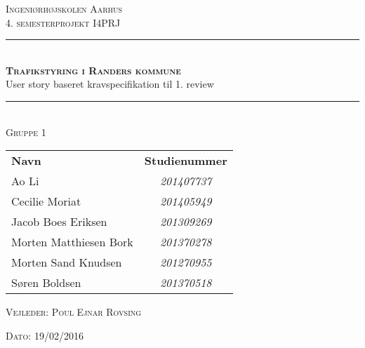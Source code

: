 \newcommand{\HRule}{\rule{\linewidth}{0.1mm}} %

\begin{center}
	\vspace{3cm}
	\textsc{\LARGE Ingeniørhøjskolen Aarhus}\\[1.5cm] %
	
	\textsc{\large 4. semesterprojekt I4PRJ}\\[2.5cm] 
	\HRule \\[0.8cm]
	{\huge \bfseries \textsc{Trafikstyring i Randers kommune}} \\[0.5cm]{\LARGE User story baseret kravspecifikation til 1. review} \\[0.4cm]
	\HRule \\[1.5cm]
	
	\textsc{\large Gruppe 1}\\
	\vspace{0.5 in}
	\begin{center}
		\begin{tabular}{l c}
			\textbf{Navn} & \textbf{Studienummer} \\
			Ao Li & \textsl{201407737}    \\
			Cecilie Moriat & \textsl{201405949}  \\
			Jacob Boes Eriksen & \textsl{201309269} \\
			Morten Matthiesen Bork & \textsl{201370278}  \\
			Morten Sand Knudsen & \textsl{201270955}  \\
			Søren Boldsen & \textsl{201370518}  \\
			
		\end{tabular}
	\end{center}
	\vspace{0.5 in}
	
	\textsc{\large Vejleder: Poul Ejnar Rovsing}
	\vspace{0.5 in}
	
	\textsc{\large Dato: 19/02/2016}\\
	\vfill %
	
\end{center} %

\clearpage